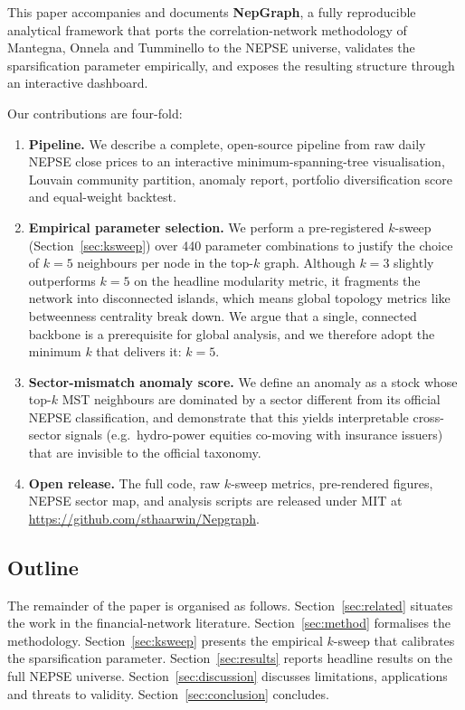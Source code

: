 This paper accompanies and documents \textbf{NepGraph}, a fully
reproducible analytical framework that ports the correlation-network
methodology of Mantegna, Onnela and Tumminello to the NEPSE universe,
validates the sparsification parameter empirically, and exposes the
resulting structure through an interactive dashboard.

Our contributions are four-fold:
\begin{enumerate}
  \item \textbf{Pipeline.} We describe a complete, open-source pipeline
  from raw daily NEPSE close prices to an interactive minimum-spanning-tree
  visualisation, Louvain community partition, anomaly report, portfolio
  diversification score and equal-weight backtest.

  \item \textbf{Empirical parameter selection.} We perform a
  pre-registered $k$-sweep (Section~\ref{sec:ksweep}) over
  \num{440} parameter combinations to justify the choice of $k=5$
  neighbours per node in the top-$k$ graph.  Although $k=3$ slightly
  outperforms $k=5$ on the headline modularity metric, it fragments the
  network into disconnected islands, which means global topology
  metrics like betweenness centrality break down.  We argue that a
  single, connected backbone is a prerequisite for global analysis, and
  we therefore adopt the minimum $k$ that delivers it: $k=5$.

  \item \textbf{Sector-mismatch anomaly score.} We define an anomaly as
  a stock whose top-$k$ MST neighbours are dominated by a sector
  different from its official NEPSE classification, and demonstrate that
  this yields interpretable cross-sector signals (e.g.\ hydro-power
  equities co-moving with insurance issuers) that are invisible to the
  official taxonomy.

  \item \textbf{Open release.} The full code, raw $k$-sweep metrics,
  pre-rendered figures, NEPSE sector map, and analysis scripts are
  released under MIT at \url{https://github.com/sthaarwin/Nepgraph}.
\end{enumerate}

\subsection{Outline}
The remainder of the paper is organised as follows.
Section~\ref{sec:related} situates the work in the financial-network
literature.  Section~\ref{sec:method} formalises the methodology.
Section~\ref{sec:ksweep} presents the empirical $k$-sweep that calibrates
the sparsification parameter.  Section~\ref{sec:results} reports headline
results on the full NEPSE universe.
Section~\ref{sec:discussion} discusses limitations, applications and
threats to validity.  Section~\ref{sec:conclusion} concludes.

\newpage

